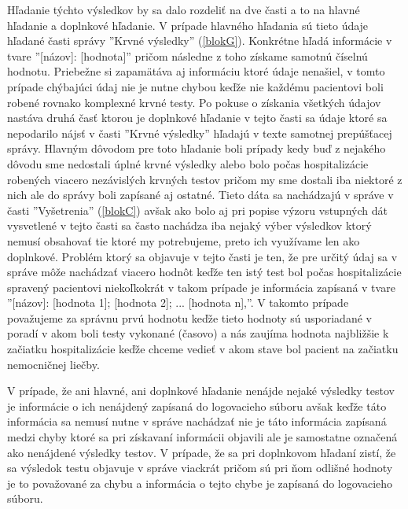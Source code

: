Hľadanie týchto výsledkov by sa dalo rozdeliť na dve časti a to na hlavné hľadanie a doplnkové hľadanie. V prípade hlavného hľadania sú tieto údaje hľadané časti správy ''Krvné výsledky'' (\ref{blokG}). Konkrétne hľadá informácie v tvare ''[názov]: [hodnota]'' pričom následne z toho získame samotnú číselnú hodnotu. Priebežne si zapamätáva aj informáciu ktoré údaje nenašiel, v tomto prípade chýbajúci údaj nie je nutne chybou keďže nie každému pacientovi boli robené rovnako komplexné krvné testy. Po pokuse o získania všetkých údajov nastáva druhá časť ktorou je doplnkové hľadanie v tejto časti sa údaje ktoré sa nepodarilo nájsť v časti ''Krvné výsledky'' hľadajú v texte samotnej prepúšťacej správy. Hlavným dôvodom pre toto hľadanie boli prípady kedy buď z nejakého dôvodu sme nedostali úplné krvné výsledky alebo bolo počas hospitalizácie robených viacero nezávislých krvných testov pričom my sme dostali iba niektoré z nich ale do správy boli zapísané aj ostatné. Tieto dáta sa nachádzajú v správe v časti ''Vyšetrenia'' (\ref{blokC}) avšak ako bolo aj pri popise výzoru vstupných dát vysvetlené v tejto časti sa často nachádza iba nejaký výber výsledkov ktorý nemusí obsahovať tie ktoré my potrebujeme, preto ich využívame len ako doplnkové. Problém ktorý sa objavuje v tejto časti je ten, že pre určitý údaj sa v správe môže nachádzať viacero hodnôt keďže ten istý test bol počas hospitalizácie spravený pacientovi niekoľkokrát v takom prípade je informácia zapísaná v tvare ''[názov]: [hodnota 1]; [hodnota 2]; ... [hodnota n],''. V takomto prípade považujeme za správnu prvú hodnotu keďže tieto hodnoty sú usporiadané v poradí v akom boli testy vykonané (časovo) a nás zaujíma hodnota najbližšie k začiatku hospitalizácie keďže chceme vedieť v akom stave bol pacient na začiatku nemocničnej liečby.

V prípade, že ani hlavné, ani doplnkové hľadanie nenájde nejaké výsledky testov je informácie o ich nenájdený zapísaná do logovacieho súboru avšak keďže táto informácia sa nemusí nutne v správe nachádzať nie je táto informácia zapísaná medzi chyby ktoré sa pri získavaní informácii objavili ale je samostatne označená ako nenájdené výsledky testov. V prípade, že sa pri doplnkovom hľadaní zistí, že sa výsledok testu objavuje v správe viackrát pričom sú pri ňom odlišné hodnoty je to považované za chybu a informácia o tejto chybe je zapísaná do logovacieho súboru.

